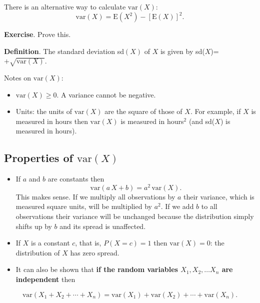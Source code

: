 \documentclass[
  11pt,
  british,
  openany, a4paper]{book}
\providecommand{\tightlist}{%
  \setlength{\itemsep}{0pt}\setlength{\parskip}{0pt}}
\begin{document}
There is an alternative way to calculate \(\mathrm{var}(X)\):
\[ \mathrm{var}(X) = \mathrm{E}\left(X^2\right) - [\mathrm{E}(X)]^2. \]

\textbf{Exercise}. Prove this.

\textbf{Definition}. The standard deviation sd\((X)\) of \(X\) is given by sd(\(X\))=\(+\sqrt{\mathrm{var}(X)}\).

Notes on \(\mathrm{var}(X)\):

\begin{itemize}
\tightlist
\item
  \(\mathrm{var}(X) \geq 0\). A variance cannot be negative.\\
\item
  Units: the units of \(\mathrm{var}(X)\) are the square of those of \(X\). For example, if \(X\) is measured in hours then \(\mathrm{var}(X)\) is measured in hours\(^2\) (and sd(\(X\)) is measured in hours).
\end{itemize}

\hypertarget{properties-of-mathrmvarx}{%
\subsection{\texorpdfstring{Properties of \(\mathrm{var}(X)\)}{Properties of \textbackslash mathrm\{var\}(X)}}\label{properties-of-mathrmvarx}}

\begin{itemize}
\tightlist
\item
  If \(a\) and \(b\) are constants then
  \[ \mathrm{var}(a\,X+b) = a^2\,\mathrm{var}(X). \]
  This makes sense. If we multiply all observations by \(a\) their variance, which is measured square units, will be multiplied by \(a^2\). If we add \(b\) to all observations their variance will be unchanged because the distribution simply shifts up by \(b\) and its spread is unaffected.
\item
  If \(X\) is a constant \(c\), that is, \(P(X=c)=1\) then \(\mathrm{var}(X)=0\): the distribution of \(X\) has zero spread.
\item
  It can also be shown that \textbf{if the random variables \(X_1, X_2, \ldots X_n\) are independent} then
\end{itemize}

\begin{equation}
\mathrm{var}(X_1 + X_2 + \cdots + X_n) = \mathrm{var}(X_1) + \mathrm{var}(X_2) + \cdots + \mathrm{var}(X_n). 
\label{eq:varsum}
\end{equation}
\end{document}
